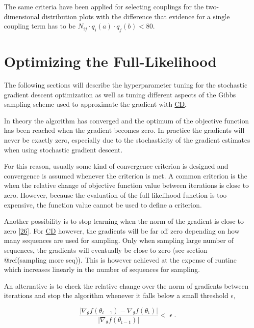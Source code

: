 \documentclass[12pt,a4paper,twoside]{book}
\theoremstyle{definition}
\theoremstyle{definition}
\theoremstyle{remark}
\begin{document}
The same criteria have been applied for selecting couplings for the
two-dimensional distribution plots with the difference that evidence for
a single coupling term has to be
\(N_{ij} \cdot q_i(a) \cdot q_j(b) < 80.\)

\section{Optimizing the
Full-Likelihood}\label{methods-optimizing-full-likelihood}

The following sections will describe the hyperparameter tuning for the
stochastic gradient descent optimization as well as tuning different
aspects of the Gibbs sampling scheme used to approximate the gradient
with \protect\hyperlink{abbrev}{CD}.

In theory the algorithm has converged and the optimum of the objective
function has been reached when the gradient becomes zero. In practice
the gradients will never be exactly zero, especially due to the
stochasticity of the gradient estimates when using stochastic gradient
descent.

For this reason, usually some kind of convergence criterion is designed
and convergence is assumed whenever the criterion is met. A common
criterion is the when the relative change of objective function value
between iterations is close to zero. However, because the evaluation of
the full likelihood function is too expensive, the function value cannot
be used to define a criterion.

Another possibility is to stop learning when the norm of the gradient is
close to zero {[}\protect\hyperlink{ref-Carreira-Perpinan2005}{26}{]}.
For \protect\hyperlink{abbrev}{CD} however, the gradients will be far
off zero depending on how many sequences are used for sampling. Only
when sampling large number of sequences, the gradients will eventually
be close to zero (see section @ref(sampling more seq)). This is however
achieved at the expense of runtine which increases linearly in the
number of sequences for sampling.

An alternative is to check the relative change over the norm of
gradients between iterations and stop the algorithm whenever it falls
below a small threshold \(\epsilon\),

\begin{equation}
  \frac{|\nabla_\theta f(\theta_{t-1}) - \nabla_\theta f(\theta_{t})|}{|\nabla_\theta f(\theta_{t-1})|}  < \; \epsilon \; .
  \label{eq:gradient-convergence-criterion}
\end{equation}
\end{document}
